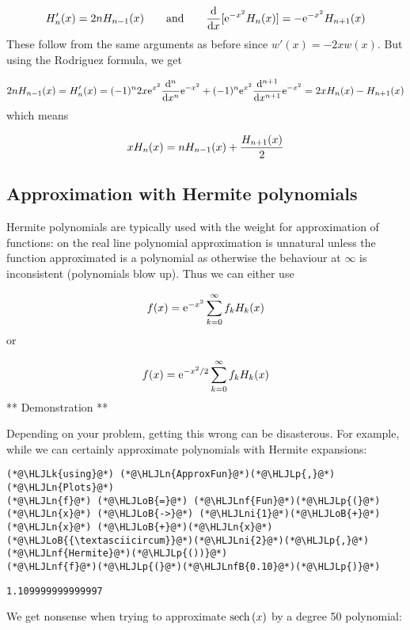 \documentclass[12pt,landscape]{article}
\newcommand{\HLJLk}[1]{\textcolor[RGB]{148,91,176}{\textbf{#1}}}
\newcommand{\HLJLn}[1]{#1}
\newcommand{\HLJLnf}[1]{\textcolor[RGB]{66,102,213}{#1}}
\newcommand{\HLJLnfB}[1]{\textcolor[RGB]{59,151,46}{#1}}
\newcommand{\HLJLni}[1]{\textcolor[RGB]{59,151,46}{#1}}
\newcommand{\HLJLoB}[1]{\textcolor[RGB]{102,102,102}{\textbf{#1}}}
\newcommand{\HLJLp}[1]{#1}
\def\qqand{\qquad\hbox{and}\qquad}
\def\D{ {\rm d} }
\def\E{ {\rm e} }
\def\sech{ {\rm sech}\, }
\def\dx{\D x}
\begin{document}
{\[
H_n'(x) = 2n H_{n-1}(x) \qqand {\D \over \dx}[\E^{-x^2} H_n(x)] = -\E^{-x^2} H_{n+1}(x)
\]
These follow from the same arguments as before since $w'(x) = -2x w(x)$. But using the Rodriguez formula, we get

\[
2n H_{n-1}(x)  = H_{n}'(x) = (-1)^{n} 2 x  \E^{x^2}  {\D^{n} \over \dx^{n}} \E^{-x^2}  + (-1)^n \E^{x^2}  {\D^{n+1} \over \dx^{n+1}} \E^{-x^2} = 2x H_n(x) - H_{n+1}(x)
\]
which means

\[
x H_n(x) = nH_{n-1}(x) +{H_{n+1}(x) \over 2}
\]
\newpage
\subsection{Approximation with Hermite polynomials}
Hermite polynomials are typically used with the weight for approximation of functions: on the real line polynomial approximation is unnatural unless  the function approximated is a polynomial as otherwise the behaviour at \ensuremath{\infty} is inconsistent (polynomials blow up).  Thus we can either use

\[
f(x) = \E^{-x^2}\sum_{k=0}^\infty f_k H_k(x)
\]
or

\[
f(x) = \E^{-x^2/2}\sum_{k=0}^\infty f_k H_k(x)
\]
** Demonstration **

Depending on your problem, getting this wrong can be disasterous. For example, while we can certainly approximate polynomials with Hermite expansions:


\begin{lstlisting}
(*@\HLJLk{using}@*) (*@\HLJLn{ApproxFun}@*)(*@\HLJLp{,}@*) (*@\HLJLn{Plots}@*)
(*@\HLJLn{f}@*) (*@\HLJLoB{=}@*) (*@\HLJLnf{Fun}@*)(*@\HLJLp{(}@*)(*@\HLJLn{x}@*) (*@\HLJLoB{->}@*) (*@\HLJLni{1}@*)(*@\HLJLoB{+}@*)(*@\HLJLn{x}@*) (*@\HLJLoB{+}@*)(*@\HLJLn{x}@*)(*@\HLJLoB{{\textasciicircum}}@*)(*@\HLJLni{2}@*)(*@\HLJLp{,}@*) (*@\HLJLnf{Hermite}@*)(*@\HLJLp{())}@*)
(*@\HLJLnf{f}@*)(*@\HLJLp{(}@*)(*@\HLJLnfB{0.10}@*)(*@\HLJLp{)}@*)
\end{lstlisting}

\begin{lstlisting}
1.109999999999997
\end{lstlisting}


We get nonsense when trying to approximate $\sech(x)$ by a degree 50 polynomial:


}
\end{document}
